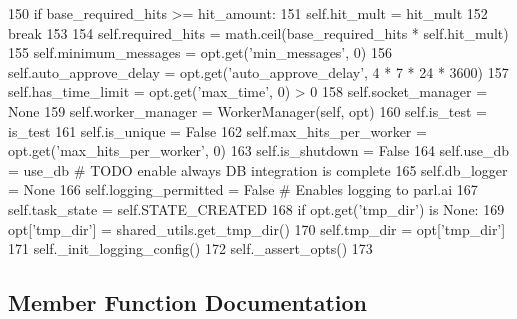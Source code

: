 \begin{DoxyCode}
150             \textcolor{keywordflow}{if} base\_required\_hits >= hit\_amount:
151                 self.hit\_mult = hit\_mult
152                 \textcolor{keywordflow}{break}
153 
154         self.required\_hits = math.ceil(base\_required\_hits * self.hit\_mult)
155         self.minimum\_messages = opt.get(\textcolor{stringliteral}{'min\_messages'}, 0)
156         self.auto\_approve\_delay = opt.get(\textcolor{stringliteral}{'auto\_approve\_delay'}, 4 * 7 * 24 * 3600)
157         self.has\_time\_limit = opt.get(\textcolor{stringliteral}{'max\_time'}, 0) > 0
158         self.socket\_manager = \textcolor{keywordtype}{None}
159         self.worker\_manager = WorkerManager(self, opt)
160         self.is\_test = is\_test
161         self.is\_unique = \textcolor{keyword}{False}
162         self.max\_hits\_per\_worker = opt.get(\textcolor{stringliteral}{'max\_hits\_per\_worker'}, 0)
163         self.is\_shutdown = \textcolor{keyword}{False}
164         self.use\_db = use\_db  \textcolor{comment}{# TODO enable always DB integration is complete}
165         self.db\_logger = \textcolor{keywordtype}{None}
166         self.logging\_permitted = \textcolor{keyword}{False}  \textcolor{comment}{# Enables logging to parl.ai}
167         self.task\_state = self.STATE\_CREATED
168         \textcolor{keywordflow}{if} opt.get(\textcolor{stringliteral}{'tmp\_dir'}) \textcolor{keywordflow}{is} \textcolor{keywordtype}{None}:
169             opt[\textcolor{stringliteral}{'tmp\_dir'}] = shared\_utils.get\_tmp\_dir()
170         self.tmp\_dir = opt[\textcolor{stringliteral}{'tmp\_dir'}]
171         self.\_init\_logging\_config()
172         self.\_assert\_opts()
173 
\end{DoxyCode}


\subsection{Member Function Documentation}
\mbox{\label{classparlai_1_1mturk_1_1core_1_1mturk__manager_1_1MTurkManager_a67335e20ae360682d0b5681a7446492e}} 
